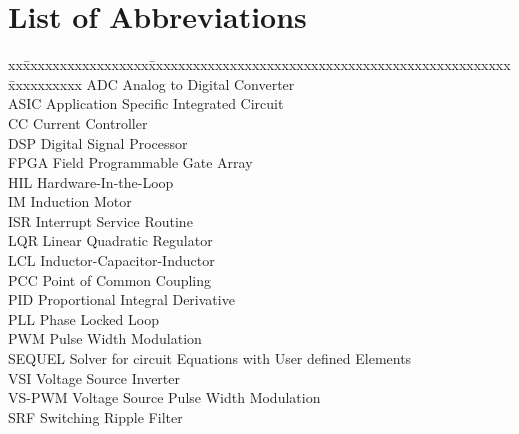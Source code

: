 
\chapter*{List of Abbreviations}
\thispagestyle{empty}
\begin{tabbing}
xx\=xxxxxxxxxxxxxxxxx\=xxxxxxxxxxxxxxxxxxxxxxxxxxxxxxxxxxxxxxxxxxxxxxxxx\=xxxxxxxxxx\kill
\>ADC \> Analog to Digital Converter\\
\>ASIC \> Application Specific Integrated Circuit\\
\>CC \> Current Controller\\
\>DSP \>  Digital Signal Processor\\
\>FPGA \> Field Programmable Gate Array\\
\>HIL \>  Hardware-In-the-Loop\\ 
\>IM \> Induction Motor\\  
\>ISR \> Interrupt Service Routine\\
\>LQR \>  Linear Quadratic Regulator\\
\>LCL \>  Inductor-Capacitor-Inductor\\
\>PCC \>  Point of Common Coupling\\ 
\>PID \> Proportional Integral Derivative\\   
\>PLL \>  Phase Locked Loop\\ 
\>PWM \>  Pulse Width Modulation\\
\>SEQUEL \> Solver for circuit Equations with User defined Elements\\
\>VSI \>  Voltage Source Inverter\\
\>VS-PWM \> Voltage Source Pulse Width Modulation\\
\>SRF \> Switching Ripple Filter \\
\end{tabbing}


